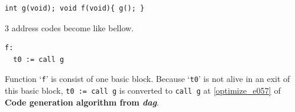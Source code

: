 \begin{Example}
\begin{verbatim}
int g(void); void f(void){ g(); }
\end{verbatim}
3 address codes become like bellow.
\begin{verbatim}
f:
  t0 := call g
\end{verbatim}
Function `{\tt{f}}' is consist of one basic block.
Because `{\tt{t0}}' is not alive in an exit of this basic block,
{\tt{t0 := call g}} is converted to {\tt{call g}} at
\ref{optimize_e057} of {\bf Code generation algorithm from {\em dag}}.
\end{Example}

\begin{Example}
\label{optimize_e017}
\begin{verbatim}


\end{verbatim}
\end{Example}
